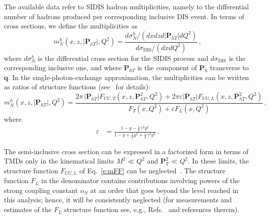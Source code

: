 \documentclass[aps,preprintnumbers,showpacs,nofootinbib,superscriptaddress,floatfix]{revtex4}
\newcommand{\Tperp}{T}
\begin{document}
The available data refer to SIDIS hadron multiplicities, namely to the differential number of hadrons produced per corresponding inclusive DIS event. In terms of cross sections, we define the multiplicities as
\begin{equation}
m_N^h (x,z,|\bm{P}_{h\Tperp}|, Q^2) = \frac{d \sigma_N^h / ( dx  dz d|\bm{P}_{h\Tperp}| dQ^2) }
                                                                   {d\sigma_{\text{DIS}} / ( dx dQ^2 ) }\, ,
\label{e:multiplicity}
\end{equation}
where $d\sigma_N^h$ is the differential cross section for the SIDIS process and $d\sigma_{\text{DIS}}$ is the corresponding inclusive one, 
and where \( \bm{P}_{h\Tperp} \) is the component of \( \bm{P}_{h} \) transverse to \( \bm{q} \). 
In the single-photon-exchange approximation, the multiplicities can be written as ratios of
structure functions (see~\cite{Bacchetta:2006tn} for details):
\begin{equation}
m_N^h (x,z,|\bm{P}_{h\Tperp}|, Q^2) =   
\frac{2 \pi\,|\bm{P}_{h\Tperp}| F_{UU ,T}(x,z,\bm{P}_{h\Tperp}^2, Q^2) + 2 \pi
  \varepsilon |\bm{P}_{h\Tperp}| F_{UU ,L}(x,z,\bm{P}_{h\Tperp}^2, Q^2)}
        {F_{T}(x,Q^2) + \varepsilon  F_{L}(x,Q^2)} \, ,
 \label{e:mFF}
\end{equation} 
where
\begin{align}
\varepsilon &= \frac{1-y -\frac{1}{4} \gamma^2 y^2}{1-y+\frac{1}{2} y^2 +\frac{1}{4} \gamma^2 y^2} \ .
\end{align}  

The semi-inclusive cross section can be expressed in a factorized form in
terms of TMDs only in the kinematical limits $M^2 \ll Q^2$ and $\bm{P}_T^2 \ll
Q^2$. In these limits, the structure function $F_{UU,L}$ of Eq.~\eqref{e:mFF}
can be neglected~\cite{Bacchetta:2008xw}. 
 The structure function $F_L$ in the denominator contains contributions
 involving powers of the strong coupling constant $\alpha_S$ at an order that
 goes beyond the level reached in this analysis; 
hence, it will be
 consistently neglected (for measurements and
 estimates of the $F_L$ structure function see, e.g.,
 Refs.~\cite{Chekanov:2009na,Andreev:2013vha} and references therein).  
\end{document}
